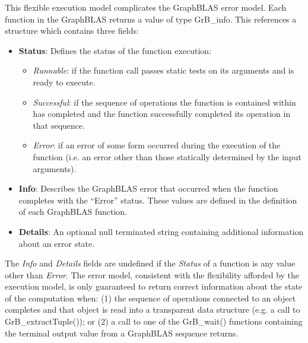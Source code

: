 This flexible execution model complicates the GraphBLAS error model.
Each function in the GraphBLAS returns a value of type GrB\_info.
This references a structure which contains three fields:
\begin{itemize}
\item {\bf Status}: Defines the status of the function execution:  
\begin{itemize}
\item {\it Runnable}: if the function call passes static tests 
on its arguments and is ready to execute.  
\item {\it Successful}: if the sequence of operations the function
is contained within has completed and the function successfully completed
its operation in that sequence.
\item {\it Error}: if an error of some form occurred during the execution
of the function (i.e. an error other than those statically determined 
by the input arguments).
\end{itemize}
\item {\bf Info}: Describes the GraphBLAS error that occurred when the
function completes with the ``Error'' status.  These values
are defined in the definition of each GraphBLAS function. 
\item {\bf Details}: An optional null terminated string containing 
additional information about an error state.
\end{itemize}
The {\it Info} and {\it Details} fields are undefined if the {\it Status}
of a function is any value other than {\it Error}.   The error 
model, consistent with the flexibility afforded by the execution model, 
is only guaranteed to return correct information about the state of the 
computation when: (1) the sequence of operations connected to an object
completes and that object is read into a transparent data structure 
(e.g. a call to GrB\_extractTuple()); or (2) a call to one of the GrB\_wait()
functions containing the terminal output value from a GraphBLAS sequence 
returns.

 
